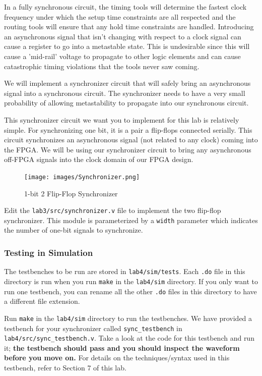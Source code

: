 \documentclass[11pt]{article}
\begin{document}
In a fully synchronous circuit, the timing tools will determine the fastest clock frequency under which the setup time constraints are all respected and the routing tools will ensure that any hold time constraints are handled. Introducing an asynchronous signal that isn't changing with respect to a clock signal can cause a register to go into a metastable state. This is undesirable since this will cause a 'mid-rail' voltage to propagate to other logic elements and can cause catastrophic timing violations that the tools never saw coming.

We will implement a synchronizer circuit that will safely bring an asynchronous signal into a synchronous circuit. The synchronizer needs to have a very small probability of allowing metastability to propagate into our synchronous circuit.

This synchronizer circuit we want you to implement for this lab is relatively simple. For synchronizing one bit, it is a pair a flip-flops connected serially. This circuit synchronizes an asynchronous signal (not related to any clock) coming into the FPGA. We will be using our synchronizer circuit to bring any asynchronous off-FPGA signals into the clock domain of our FPGA design.

\begin{figure}[H]
	\vspace{0.5cm}
	\centerline{\texttt{[image: images/Synchronizer.png]}}
	\caption{1-bit 2 Flip-Flop Synchronizer}
\end{figure}

Edit the \verb|lab3/src/synchronizer.v| file to implement the two flip-flop synchronizer. This module is parameterized by a \verb|width| parameter which indicates the number of one-bit signals to synchronize.

\subsubsection{Testing in Simulation}
The testbenches to be run are stored in \verb|lab4/sim/tests|. Each \verb|.do| file in this directory is run when you run \verb|make| in the \verb|lab4/sim| directory. If you only want to run one testbench, you can rename all the other \verb|.do| files in this directory to have a different file extension.

Run \verb|make| in the \verb|lab4/sim| directory to run the testbenches. We have provided a testbench for your synchronizer called \verb|sync_testbench| in \verb|lab4/src/sync_testbench.v|. Take a look at the code for this testbench and run it; \textbf{the testbench should pass and you should inspect the waveform before you move on.} For details on the techniques/syntax used in this testbench, refer to Section 7 of this lab.
\end{document}
